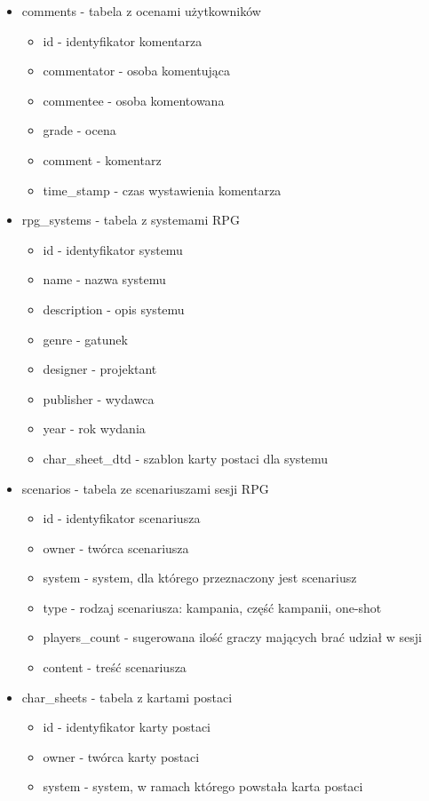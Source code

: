 \begin{itemize}
\begin{itemize}
	\end{itemize}
\item comments - tabela z ocenami użytkowników
	\begin{itemize}
	\item id - identyfikator komentarza
	\item commentator - osoba komentująca
	\item commentee - osoba komentowana
	\item grade - ocena
	\item comment - komentarz
	\item time\_stamp - czas wystawienia komentarza
	\end{itemize}
\item rpg\_systems - tabela z systemami RPG
	\begin{itemize}
	\item id - identyfikator systemu
	\item name - nazwa systemu
	\item description - opis systemu
	\item genre - gatunek
	\item designer - projektant
	\item publisher - wydawca
	\item year - rok wydania
	\item char\_sheet\_dtd - szablon karty postaci dla systemu
	\end{itemize}
\item scenarios - tabela ze scenariuszami sesji RPG
	\begin{itemize}
	\item id - identyfikator scenariusza
	\item owner - twórca scenariusza
	\item system - system, dla którego przeznaczony jest scenariusz
	\item type - rodzaj scenariusza: kampania, część kampanii, one-shot
	\item players\_count - sugerowana ilość graczy mających brać udział w sesji
	\item content - treść scenariusza
	\end{itemize}
\item char\_sheets - tabela z kartami postaci
	\begin{itemize}
	\item id - identyfikator karty postaci
	\item owner - twórca karty postaci
	\item system - system, w ramach którego powstała karta postaci

\end{itemize}
\end{itemize}
